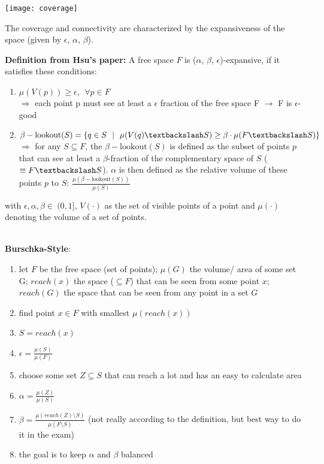 \begin{multicols*}{2}
\texttt{[image: coverage]}

The coverage and connectivity are characterized by the expansiveness of the space (given by $\epsilon$, $\alpha$, $\beta$).

\textbf{Definition from Hsu's paper:} A free space $F$ is ($\alpha$, $\beta$, $\epsilon$)-expansive, if it satisfies these conditions: 
\begin{enumerate}
	\item $\mu (V(p))  \geq \epsilon , ~~ \forall p \in F$ \\
	$\Rightarrow$ each point p must see at least a $\epsilon$ fraction of the free space F $\rightarrow$ F is $\epsilon$-good
	\item $\beta-\mathrm{lookout}(S) = \{q\in S ~~|~~ \mu(V(q)\textbackslash S) \geq \beta \cdot \mu(F\textbackslash S)\} $ \\
	$\Rightarrow$ for any $S \subseteq F$, the $\beta-\mathrm{lookout}(S)$ is defined as the subset of points $p$ that can see at least a $\beta$-fraction of the complementary space of $S$ ($\equiv F\textbackslash S$). $\alpha$ is then defined as the relative volume of these points $p$ to $S$: $\frac{\mu(\beta-\mathrm{lookout}(S))}{\mu(S)}$
\end{enumerate}

with $\epsilon, \alpha, \beta \in \ (0,1]$, $V(\cdot)$ as the set of visible points of a point and $\mu(\cdot)$ denoting the volume of a set of points.

~\\
\textbf{Burschka-Style}:
\begin{enumerate}
	\item let $F$ be the free space (set of points); $\mu(G)$ the volume/ area of some set G; $reach(x)$ the space ($\subseteq F$) that can be seen from some point $x$; $reach(G)$ the space that can be seen from any point in a set $G$
	\item find point $x \in F$ with smallest $\mu(reach(x))$
	\item $S = reach(x)$
	\item $\epsilon = \frac{\mu(S)}{\mu(F)}$
	\item choose some set $Z \subseteq S$ that can reach a lot and has an easy to calculate area
	\item $\alpha = \frac{\mu(Z)}{\mu(S)}$
	\item $\beta = \frac{\mu(reach(Z) \setminus S)}{\mu(F \setminus S)}$ (not really according to the definition, but best way to do it in the exam)
	\item the goal is to keep $\alpha$ and $\beta$ balanced
\end{enumerate}


\end{multicols*}
